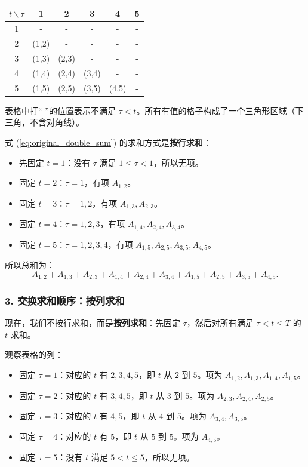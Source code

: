 \documentclass[journal,12pt,onecolumn]{IEEEtran}
\begin{document}
\begin{center}
\begin{tabular}{c|ccccc}
\(t \backslash \tau\) & 1 & 2 & 3 & 4 & 5 \\
\hline
1 & - & - & - & - & - \\
2 & (1,2) & - & - & - & - \\
3 & (1,3) & (2,3) & - & - & - \\
4 & (1,4) & (2,4) & (3,4) & - & - \\
5 & (1,5) & (2,5) & (3,5) & (4,5) & - \\
\end{tabular}
\end{center}

表格中打“-”的位置表示不满足 \(\tau < t\)。所有有值的格子构成了一个三角形区域（下三角，不含对角线）。

式 (\ref{eq:original_double_sum}) 的求和方式是\textbf{按行求和}：
\begin{itemize}
    \item 先固定 \(t=1\)：没有 \(\tau\) 满足 \(1 \le \tau < 1\)，所以无项。
    \item 固定 \(t=2\)：\(\tau=1\)，有项 \(A_{1,2}\)。
    \item 固定 \(t=3\)：\(\tau=1,2\)，有项 \(A_{1,3}, A_{2,3}\)。
    \item 固定 \(t=4\)：\(\tau=1,2,3\)，有项 \(A_{1,4}, A_{2,4}, A_{3,4}\)。
    \item 固定 \(t=5\)：\(\tau=1,2,3,4\)，有项 \(A_{1,5}, A_{2,5}, A_{3,5}, A_{4,5}\)。
\end{itemize}

所以总和为：
\[
A_{1,2} + A_{1,3} + A_{2,3} + A_{1,4} + A_{2,4} + A_{3,4} + A_{1,5} + A_{2,5} + A_{3,5} + A_{4,5}.
\]

\subsubsection*{3. 交换求和顺序：按列求和}

现在，我们不按行求和，而是\textbf{按列求和}：先固定 \(\tau\)，然后对所有满足 \(\tau < t \le T\) 的 \(t\) 求和。

观察表格的列：
\begin{itemize}
    \item 固定 \(\tau=1\)：对应的 \(t\) 有 \(2,3,4,5\)，即 \(t\) 从 \(2\) 到 \(5\)。项为 \(A_{1,2}, A_{1,3}, A_{1,4}, A_{1,5}\)。
    \item 固定 \(\tau=2\)：对应的 \(t\) 有 \(3,4,5\)，即 \(t\) 从 \(3\) 到 \(5\)。项为 \(A_{2,3}, A_{2,4}, A_{2,5}\)。
    \item 固定 \(\tau=3\)：对应的 \(t\) 有 \(4,5\)，即 \(t\) 从 \(4\) 到 \(5\)。项为 \(A_{3,4}, A_{3,5}\)。
    \item 固定 \(\tau=4\)：对应的 \(t\) 有 \(5\)，即 \(t\) 从 \(5\) 到 \(5\)。项为 \(A_{4,5}\)。
    \item 固定 \(\tau=5\)：没有 \(t\) 满足 \(5 < t \le 5\)，所以无项。
\end{itemize}
\end{document}
